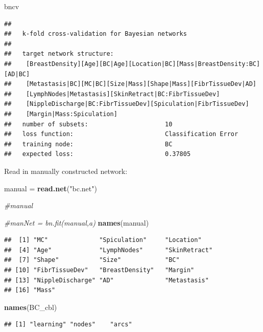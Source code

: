 \documentclass[]{article}
\newenvironment{Shaded}{\begin{snugshade}}{\end{snugshade}}
\newcommand{\KeywordTok}[1]{\textcolor[rgb]{0.13,0.29,0.53}{\textbf{{#1}}}}
\newcommand{\StringTok}[1]{\textcolor[rgb]{0.31,0.60,0.02}{{#1}}}
\newcommand{\CommentTok}[1]{\textcolor[rgb]{0.56,0.35,0.01}{\textit{{#1}}}}
\newcommand{\NormalTok}[1]{{#1}}
\begin{document}
\begin{Shaded}
\begin{Highlighting}[]
\NormalTok{bncv}
\end{Highlighting}
\end{Shaded}

\begin{verbatim}
## 
##   k-fold cross-validation for Bayesian networks
## 
##   target network structure:
##    [BreastDensity][Age][BC|Age][Location|BC][Mass|BreastDensity:BC][AD|BC]
##    [Metastasis|BC][MC|BC][Size|Mass][Shape|Mass][FibrTissueDev|AD]
##    [LymphNodes|Metastasis][SkinRetract|BC:FibrTissueDev]
##    [NippleDischarge|BC:FibrTissueDev][Spiculation|FibrTissueDev]
##    [Margin|Mass:Spiculation]
##   number of subsets:                     10 
##   loss function:                         Classification Error 
##   training node:                         BC 
##   expected loss:                         0.37805
\end{verbatim}

Read in manually constructed network:

\begin{Shaded}
\begin{Highlighting}[]
\NormalTok{manual =}\StringTok{ }\KeywordTok{read.net}\NormalTok{(}\StringTok{"bc.net"}\NormalTok{)}

\CommentTok{#manual}

\CommentTok{#manNet = bn.fit(manual,a)}
\KeywordTok{names}\NormalTok{(manual)}
\end{Highlighting}
\end{Shaded}

\begin{verbatim}
##  [1] "MC"              "Spiculation"     "Location"       
##  [4] "Age"             "LymphNodes"      "SkinRetract"    
##  [7] "Shape"           "Size"            "BC"             
## [10] "FibrTissueDev"   "BreastDensity"   "Margin"         
## [13] "NippleDischarge" "AD"              "Metastasis"     
## [16] "Mass"
\end{verbatim}

\begin{Shaded}
\begin{Highlighting}[]
\KeywordTok{names}\NormalTok{(BC_cbl)}
\end{Highlighting}
\end{Shaded}

\begin{verbatim}
## [1] "learning" "nodes"    "arcs"
\end{verbatim}
\end{document}
